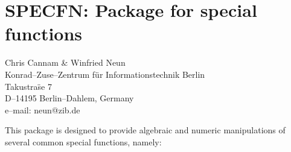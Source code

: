 \chapter{SPECFN: Package for special functions}
\label{SPECFN}

{\footnotesize
\begin{center}
Chris Cannam \& Winfried Neun \\
Konrad--Zuse--Zentrum f\"ur Informationstechnik Berlin \\
Takustra\"se 7 \\
D--14195 Berlin--Dahlem, Germany \\[0.05in]
e--mail: neun@zib.de
\end{center}
}

This package is designed to provide algebraic and numeric manipulations of
several common special functions, namely:

